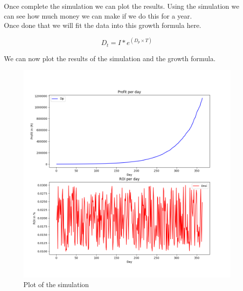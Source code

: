 Once complete the simulation we can plot the results. Using the simulation we can see how much money we can make if we do this for a year.\\

Once done that we will fit the data into this growth formula here.

\begin{equation}
    D_{t} = I*e^{(D_{p} \times T)}
\end{equation}

 

We can now plot the results of the simulation and the growth formula.

\begin{figure}[H]
    \centering
    \includegraphics[scale=0.5]{images/plot.png}
    \caption{Plot of the simulation}
    \label{fig:plot}
\end{figure}


